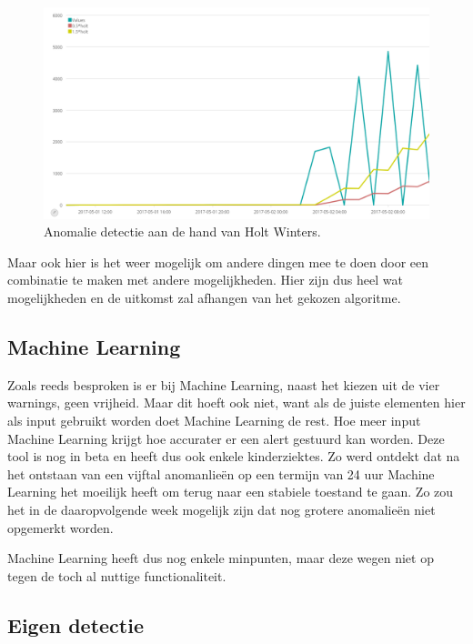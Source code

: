 \begin{figure}[h]
	\includegraphics[width=16cm]{img/holtwinters}
	\caption{Anomalie detectie aan de hand van Holt Winters.}
	\label{fig:holtwinters}
\end{figure}


Maar ook hier is het weer mogelijk om andere dingen mee te doen door een combinatie te maken met andere mogelijkheden.
Hier zijn dus heel wat mogelijkheden en de uitkomst zal afhangen van het gekozen algoritme. 

\subsection{Machine Learning}
\label{subsec:machine-learning}

Zoals reeds besproken is er bij Machine Learning, naast het kiezen uit de vier warnings, geen vrijheid. Maar dit hoeft ook niet, want als de juiste elementen hier als input gebruikt worden doet Machine Learning de rest. Hoe meer input Machine Learning krijgt hoe accurater er een alert gestuurd kan worden. 
Deze tool is nog in beta en heeft dus ook enkele kinderziektes. Zo werd ontdekt dat na het ontstaan van een vijftal anomanlieën op een termijn van 24 uur Machine Learning het moeilijk heeft om terug naar een stabiele toestand te gaan. Zo zou het in de daaropvolgende week mogelijk zijn dat nog grotere anomalieën niet opgemerkt worden.

Machine Learning heeft dus nog enkele minpunten, maar deze wegen niet op tegen de toch al nuttige functionaliteit.

\subsection{Eigen detectie}
\label{subsec:eingen-detectie}

